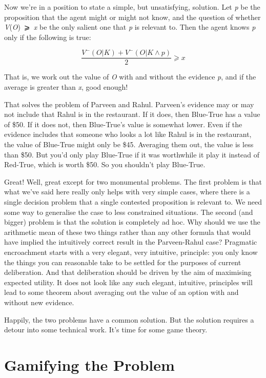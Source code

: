 \documentclass[
  10pt,
  letterpaper,
  DIV=11,
  numbers=noendperiod,
  twoside]{scrartcl}
\begin{document}
Now we're in a position to state a simple, but unsatisfying, solution.
Let \emph{p} be the proposition that the agent might or might not know,
and the question of whether \emph{V}(\emph{O})~⩾~\emph{x} be the only
salient one that \emph{p} is relevant to. Then the agent knows \emph{p}
only if the following is true:

\[
\frac{V^-(O | K) + V^-(O | K \wedge p)}{2} ⩾ x
\]

That is, we work out the value of \emph{O} with and without the evidence
\emph{p}, and if the average is greater than \emph{x}, good enough!

That solves the problem of Parveen and Rahul. Parveen's evidence may or
may not include that Rahul is in the restaurant. If it does, then
Blue-True has a value of \$50. If it does not, then Blue-True's value is
somewhat lower. Even if the evidence includes that someone who looks a
lot like Rahul is in the restaurant, the value of Blue-True might only
be \$45. Averaging them out, the value is less than \$50. But you'd only
play Blue-True if it was worthwhile it play it instead of Red-True,
which is worth \$50. So you shouldn't play Blue-True.

Great! Well, great except for two monumental problems. The first problem
is that what we've said here really only helps with very simple cases,
where there is a single decision problem that a single contested
proposition is relevant to. We need some way to generalise the case to
less constrained situations. The second (and bigger) problem is that the
solution is completely ad hoc. Why should we use the arithmetic mean of
these two things rather than any other formula that would have implied
the intuitively correct result in the Parveen-Rahul case? Pragmatic
encroachment starts with a very elegant, very intuitive, principle: you
only know the things you can reasonable take to be settled for the
purposes of current deliberation. And that deliberation should be driven
by the aim of maximising expected utility. It does not look like any
such elegant, intuitive, principles will lead to some theorem about
averaging out the value of an option with and without new evidence.

Happily, the two problems have a common solution. But the solution
requires a detour into some technical work. It's time for some game
theory.

\section{Gamifying the Problem}\label{gamifyingtheproblem}
\end{document}
